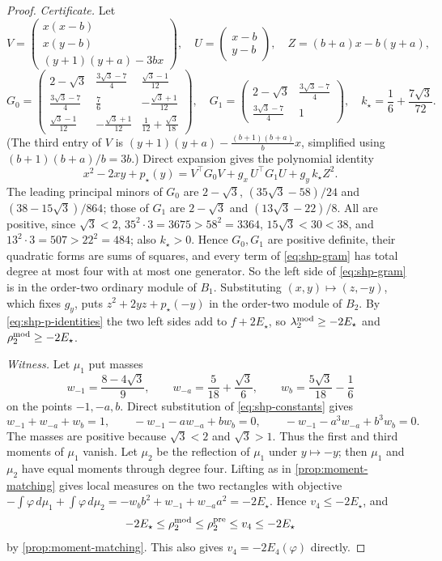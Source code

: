 \begin{proof}
\emph{Certificate.} Let
\[
  V=\begin{pmatrix}x(x-b)\\x(y-b)\\(y+1)(y+a)-3bx\end{pmatrix},\quad
  U=\begin{pmatrix}x-b\\y-b\end{pmatrix},\quad
  Z=(b+a)x-b(y+a),
\]
\[
  G_0=\begin{pmatrix}
  2-\sqrt3&\frac{3\sqrt3-7}4&\frac{\sqrt3-1}{12}\\[2pt]
  \frac{3\sqrt3-7}4&\frac76&-\frac{\sqrt3+1}{12}\\[2pt]
  \frac{\sqrt3-1}{12}&-\frac{\sqrt3+1}{12}&\frac1{12}+\frac{\sqrt3}{18}
  \end{pmatrix},\quad
  G_1=\begin{pmatrix}2-\sqrt3&\frac{3\sqrt3-7}4\\[2pt]
  \frac{3\sqrt3-7}4&1\end{pmatrix},\quad
  k_\star=\frac16+\frac{7\sqrt3}{72}.
\]
(The third entry of $V$ is $(y+1)(y+a)-\frac{(b+1)(b+a)}bx$, simplified
using $(b+1)(b+a)/b=3b$.) Direct expansion gives the polynomial identity
\begin{equation}\label{eq:shp-gram}
  x^2-2xy+p_\star(y)=V^{\top}G_0V+g_x\,U^{\top}G_1U+g_y\,k_\star Z^2 .
\end{equation}
The leading principal minors of $G_0$ are $2-\sqrt3$,
$(35\sqrt3-58)/24$ and $(38-15\sqrt3)/864$; those of $G_1$ are $2-\sqrt3$
and $(13\sqrt3-22)/8$. All are positive, since $\sqrt3<2$,
$35^2\cdot3=3675>58^2=3364$, $15\sqrt3<30<38$, and
$13^2\cdot3=507>22^2=484$; also $k_\star>0$. Hence $G_0,G_1$ are positive
definite, their quadratic forms are sums of squares, and every term of
\eqref{eq:shp-gram} has total degree at most four with at most one
generator. So the left side of \eqref{eq:shp-gram} is in the order-two
ordinary module of $B_1$. Substituting $(x,y)\mapsto(z,-y)$, which fixes
$g_y$, puts $z^2+2yz+p_\star(-y)$ in the order-two module of $B_2$. By
\eqref{eq:shp-p-identities} the two left sides add to $f+2E_\star$, so
$\lambda^{\mathrm{mod}}_2\ge-2E_\star$ and $\rho^{\mathrm{mod}}_2\ge-2E_\star$.

\emph{Witness.} Let $\mu_1$ put masses
\[
  w_{-1}=\frac{8-4\sqrt3}9,\qquad w_{-a}=\frac5{18}+\frac{\sqrt3}6,\qquad
  w_b=\frac{5\sqrt3}{18}-\frac16
\]
on the points $-1,-a,b$. Direct substitution of \eqref{eq:shp-constants}
gives
\[
  w_{-1}+w_{-a}+w_b=1,\qquad
  -w_{-1}-a w_{-a}+b w_b=0,\qquad
  -w_{-1}-a^3 w_{-a}+b^3 w_b=0.
\]
The masses are positive because $\sqrt3<2$ and $\sqrt3>1$. Thus the
first and third moments of $\mu_1$ vanish. Let $\mu_2$ be the reflection of
$\mu_1$ under $y\mapsto-y$; then $\mu_1$ and $\mu_2$ have equal moments
through degree four. Lifting as in \cref{prop:moment-matching} gives local
measures on the two rectangles with objective
$-\int\varphi\,d\mu_1+\int\varphi\,d\mu_2=-w_bb^2+w_{-1}+w_{-a}a^2
=-2E_\star$. Hence $v_4\le-2E_\star$, and
\[
  -2E_\star\le\rho^{\mathrm{mod}}_2\le\rho^{\mathrm{pre}}_2\le v_4\le-2E_\star
\]
by \cref{prop:moment-matching}. This also gives $v_4=-2E_4(\varphi)$
directly.
\end{proof}

